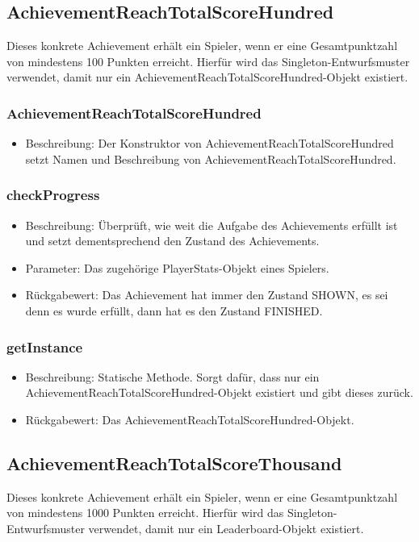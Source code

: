 \documentclass[a4paper]{scrreprt}
\begin{document}
	\subsection{AchievementReachTotalScoreHundred}
	Dieses konkrete Achievement erhält ein Spieler, wenn er eine Gesamtpunktzahl von mindestens 100 Punkten erreicht. Hierfür wird das Singleton-Entwurfsmuster verwendet, damit nur ein AchievementReachTotalScoreHundred-Objekt existiert.

	\subsubsection{AchievementReachTotalScoreHundred}
	\begin{itemize}
		\item Beschreibung: Der Konstruktor von AchievementReachTotalScoreHundred setzt Namen und Beschreibung von AchievementReachTotalScoreHundred.
	\end{itemize}
	\subsubsection{checkProgress}
	\begin{itemize}
		\item Beschreibung: Überprüft, wie weit die Aufgabe des Achievements erfüllt ist und setzt dementsprechend den Zustand des Achievements.
		\item Parameter: Das zugehörige PlayerStats-Objekt eines Spielers.
		\item Rückgabewert: Das Achievement hat immer den Zustand SHOWN, es sei denn es wurde erfüllt, dann hat es den Zustand FINISHED.
	\end{itemize}
	\subsubsection{getInstance}
	\begin{itemize}
		\item Beschreibung: Statische Methode. Sorgt dafür, dass nur ein AchievementReachTotalScoreHundred-Objekt existiert und gibt dieses zurück.
		\item Rückgabewert: Das AchievementReachTotalScoreHundred-Objekt.
	\end{itemize}

	\subsection{AchievementReachTotalScoreThousand}
	Dieses konkrete Achievement erhält ein Spieler, wenn er eine Gesamtpunktzahl von mindestens 1000 Punkten erreicht. Hierfür wird das Singleton-Entwurfsmuster verwendet, damit nur ein Leaderboard-Objekt existiert.
\end{document}
